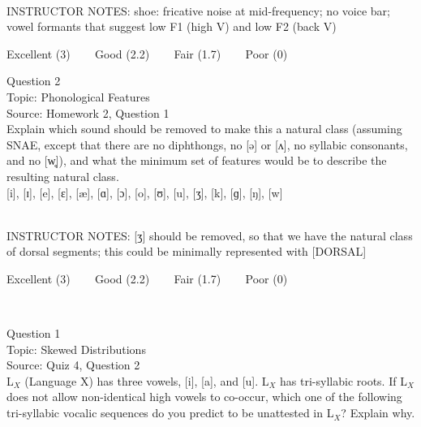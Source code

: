 \documentclass[12pt]{article}
\begin{document}
~\\
INSTRUCTOR NOTES: shoe: fricative noise at mid-frequency; no voice bar; vowel formants that suggest low F1 (high V) and low F2 (back V)


\vfill
Excellent (3) ~~~ Good (2.2) ~~~ Fair (1.7) ~~~ Poor (0)
\newpage

{\large Question 2}\\

Topic: Phonological Features\\
Source: Homework 2, Question 1\\

Explain which sound should be removed to make this a natural class (assuming SNAE, except that there are no diphthongs, no [ə] or [ʌ], no syllabic consonants, and no [w̥]), and what the minimum set of features would be to describe the resulting natural class.\\

{[i]}, {[ɪ]}, {[e]}, {[ɛ]}, {[æ]}, {[ɑ]}, {[ɔ]}, {[o]}, {[ʊ]}, {[u]}, {[ʒ]}, {[k]}, {[ɡ]}, {[ŋ]}, {[w]}


~\\
INSTRUCTOR NOTES: [ʒ] should be removed, so that we have the natural class of dorsal segments; this could be minimally represented with [DORSAL]


\vfill
Excellent (3) ~~~ Good (2.2) ~~~ Fair (1.7) ~~~ Poor (0)
\newpage

\begin{center}
\textbf{{\color{red}{\HUGE END OF EXAM}}}\\

\end{center}
\newpage

\begin{center}
\textbf{{\color{blue}{\HUGE START OF EXAM\\}}}

\textbf{{\color{blue}{\HUGE Student ID: 96220\\}}}

\textbf{{\color{blue}{\HUGE 4:40\\}}}

\end{center}
\newpage

{\large Question 1}\\

Topic: Skewed Distributions\\
Source: Quiz 4, Question 2\\

L$_X$ (Language X) has three vowels, [i], [a], and [u]. L$_X$ has tri-syllabic roots. If L$_X$ does not allow non-identical high vowels to co-occur, which one of the following tri-syllabic vocalic sequences do you predict to be unattested in L$_X$? Explain why.\\
\end{document}
